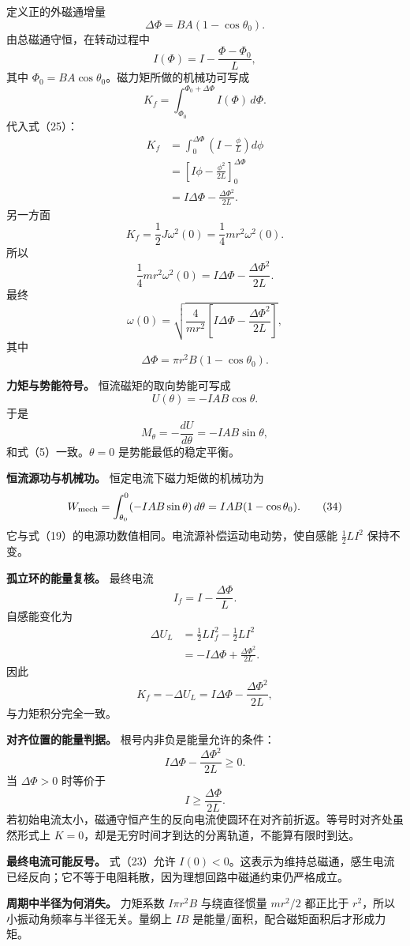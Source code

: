 \documentclass[12pt,a4paper,UTF8]{ctexart}
\begin{document}
定义正的外磁通增量 \[
\Delta\Phi=BA(1-\cos\theta_0). \tag{24}
\] 由总磁通守恒，在转动过程中 \[
I(\Phi)=I-\frac{\Phi-\Phi_0}{L}, \tag{25}
\] 其中 \(\Phi_0=BA\cos\theta_0\)。磁力矩所做的机械功可写成 \[
K_f=\int_{\Phi_0}^{\Phi_0+\Delta\Phi}I(\Phi)\,d\Phi. \tag{26}
\] 代入式（25）： \[
\begin{aligned}
K_f
&=\int_0^{\Delta\Phi}
\left(I-\frac{\phi}{L}\right)d\phi\\
&=\left[I\phi-\frac{\phi^2}{2L}\right]_0^{\Delta\Phi}\\
&=I\Delta\Phi-\frac{\Delta\Phi^2}{2L}.
\end{aligned} \tag{27}
\] 另一方面 \[
K_f=\frac12J\omega^2(0)
=\frac14mr^2\omega^2(0). \tag{28}
\] 所以 \[
\frac14mr^2\omega^2(0)
=I\Delta\Phi-\frac{\Delta\Phi^2}{2L}. \tag{29}
\] 最终 \[
\boxed{
\omega(0)
=\sqrt{
\frac{4}{mr^2}
\left[
I\Delta\Phi-\frac{\Delta\Phi^2}{2L}
\right]
}
}, \tag{30}
\] 其中 \[
\Delta\Phi=\pi r^2B(1-\cos\theta_0). \tag{31}
\]

\textbf{力矩与势能符号。} 恒流磁矩的取向势能可写成 \[
U(\theta)=-IAB\cos\theta. \tag{32}
\] 于是 \[
M_\theta=-\frac{dU}{d\theta}
=-IAB\sin\theta, \tag{33}
\] 和式（5）一致。\(\theta=0\) 是势能最低的稳定平衡。

\textbf{恒流源功与机械功。} 恒定电流下磁力矩做的机械功为 \[
W_{\rm mech}
=\int_{\theta_0}^{0}(-IAB\sin\theta)\,d\theta
=IAB(1-\cos\theta_0). \tag{34}
\] 它与式（19）的电源功数值相同。电流源补偿运动电动势，使自感能
\(\frac12LI^2\) 保持不变。

\textbf{孤立环的能量复核。} 最终电流 \[
I_f=I-\frac{\Delta\Phi}{L}. \tag{35}
\] 自感能变化为 \[
\begin{aligned}
\Delta U_L
&=\frac12LI_f^2-\frac12LI^2\\
&=-I\Delta\Phi+\frac{\Delta\Phi^2}{2L}.
\end{aligned} \tag{36}
\] 因此 \[
K_f=-\Delta U_L
=I\Delta\Phi-\frac{\Delta\Phi^2}{2L}, \tag{37}
\] 与力矩积分完全一致。

\textbf{对齐位置的能量判据。} 根号内非负是能量允许的条件： \[
I\Delta\Phi-\frac{\Delta\Phi^2}{2L}\ge0. \tag{38}
\] 当 \(\Delta\Phi>0\) 时等价于 \[
I\ge\frac{\Delta\Phi}{2L}. \tag{39}
\]
若初始电流太小，磁通守恒产生的反向电流使圆环在对齐前折返。等号时对齐处虽然形式上
\(K=0\)，却是无穷时间才到达的分离轨道，不能算有限时到达。

\textbf{最终电流可能反号。} 式（23）允许
\(I(0)<0\)。这表示为维持总磁通，感生电流已经反向；它不等于电阻耗散，因为理想回路中磁通约束仍严格成立。

\textbf{周期中半径为何消失。} 力矩系数 \(I\pi r^2B\) 与绕直径惯量
\(mr^2/2\) 都正比于 \(r^2\)，所以小振动角频率与半径无关。量纲上 \(IB\)
是能量/面积，配合磁矩面积后才形成力矩。
\end{document}
